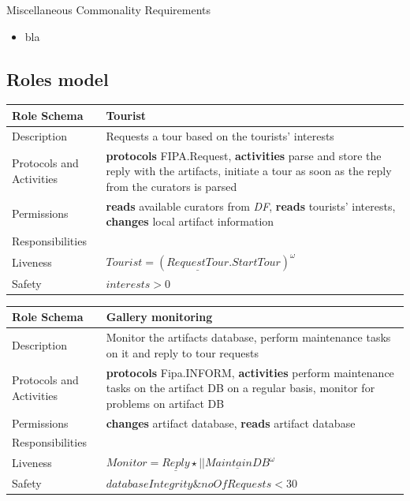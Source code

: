 \documentclass[a4paper, 11pt]{article}
\begin{document}
Miscellaneous Commonality Requirements
\begin{itemize}
\item bla
\end{itemize}

\subsection{Roles model}

\begin{table}[H]
	\label{my-label}
	\begin{tabular}{l p{7cm}}
		\hline
		Role Schema              & Tourist \\
		\hline
		Description              & Requests a tour based on the tourists' interests \\
		Protocols and Activities & \textbf{protocols} FIPA.Request, \textbf{activities} parse and store the reply with the artifacts, initiate a tour as soon as the reply from the curators is parsed \\
		Permissions              & \textbf{reads} available curators from \textit{DF}, \textbf{reads} tourists' interests, \textbf{changes} local artifact information \\
		\hline
		Responsibilities         &                   \\
		Liveness                 & \(Tourist=(\underline{RequestTour}.StartTour)^\omega \) \\
		Safety                   & \(interests > 0 \) \\
		\hline
	\end{tabular}
\end{table}

\begin{table}[H]
	\label{my-label}
	\begin{tabular}{l p{7cm}}
		\hline
		Role Schema              & Gallery monitoring \\
		\hline
		Description              & Monitor the artifacts database, perform maintenance tasks on it and reply to tour requests \\
		Protocols and Activities & \textbf{protocols} Fipa.INFORM, \textbf{activities} perform maintenance tasks on the artifact DB on a regular basis, monitor for problems on artifact DB \\
		Permissions              & \textbf{changes} artifact database, \textbf{reads} artifact database \\
		\hline
		Responsibilities         &                   \\
		Liveness                 & \(Monitor=\underline{Reply}\star||\underline{MaintainDB}^\omega \) \\
		Safety                   & \(databaseIntegrity \& noOfRequests < 30 \) \\
		\hline
	\end{tabular}
\end{table}
\end{document}
